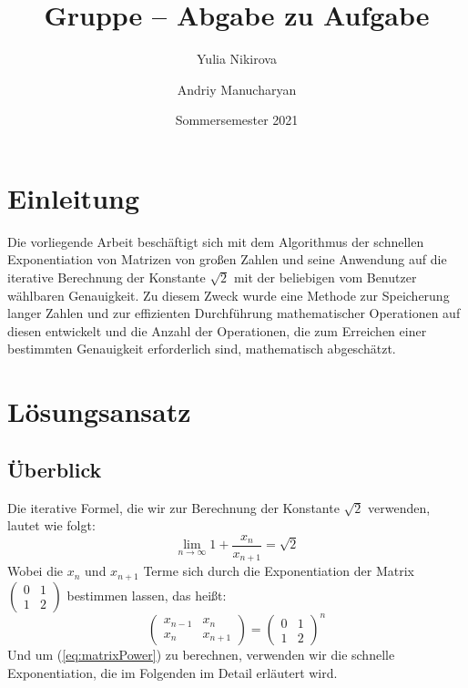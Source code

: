\documentclass[course=erap]{aspdoc}
\author{Yulia Nikirova \and Andriy Manucharyan}
\date{Sommersemester 2021} %
\title{Gruppe \theGroup{} -- Abgabe zu Aufgabe \theNumber}
\begin{document}
\maketitle

\section{Einleitung}
Die vorliegende Arbeit beschäftigt sich mit dem Algorithmus der schnellen Exponentiation von Matrizen von großen Zahlen und seine Anwendung auf die iterative Berechnung der Konstante  \(\sqrt{2}\) mit der beliebigen vom Benutzer wählbaren Genauigkeit. Zu diesem Zweck wurde eine Methode zur Speicherung langer Zahlen und zur effizienten Durchführung mathematischer Operationen auf diesen entwickelt und die Anzahl der Operationen, die zum Erreichen einer bestimmten Genauigkeit erforderlich sind, mathematisch abgeschätzt.
\section{Lösungsansatz}
\subsection{Überblick}%
Die iterative Formel, die wir zur Berechnung der Konstante \(\sqrt{2}\) verwenden, lautet wie folgt:
\begin{equation}\label{eq:iterativeSqrt2}
\lim_{n \to \infty} {1+\frac{x_n}{x_{n+1}}} = \sqrt{2} 
\end{equation}
Wobei die $x_n$ und $x_{n+1}$ Terme sich durch die Exponentiation der Matrix
$\begin{pmatrix}
  0 & 1\\ 
  1 & 2
\end{pmatrix}$ bestimmen lassen, das heißt:
\begin{equation}\label{eq:matrixPower}
{\begin{pmatrix}
x_{n-1} & x_n \\
x_n & x_{n+1}
\end{pmatrix} } =
{\begin{pmatrix}
0 & 1\\
1 & 2
\end{pmatrix} }^n
\end{equation}
Und um (\ref{eq:matrixPower}) zu berechnen, verwenden wir die schnelle Exponentiation, die im Folgenden im Detail erläutert wird.
\end{document}
